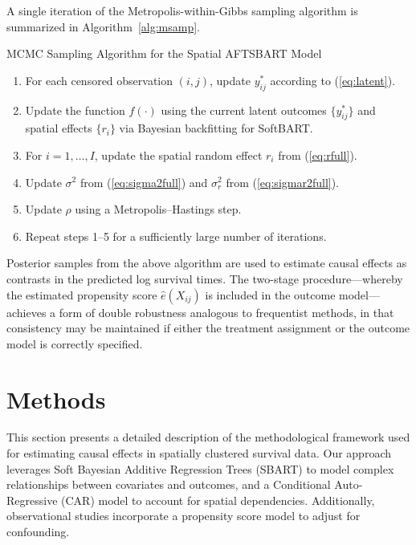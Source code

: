 \documentclass[useAMS,referee]{biom}
\begin{document}
A single iteration of the Metropolis-within-Gibbs sampling algorithm is summarized in Algorithm~\ref{alg:msamp}.

\begin{algorithm}[H]
\caption{MCMC Sampling Algorithm for the Spatial AFTSBART Model}\label{alg:msamp}
\begin{enumerate}
    \item For each censored observation $(i,j)$, update $y_{ij}^\ast$ according to (\ref{eq:latent}).
    \item Update the function $f(\cdot)$ using the current latent outcomes $\{y_{ij}^\ast\}$ and spatial effects $\{r_i\}$ via Bayesian backfitting for SoftBART.
    \item For $i=1,\ldots,I$, update the spatial random effect $r_i$ from (\ref{eq:rfull}).
    \item Update $\sigma^2$ from (\ref{eq:sigma2full}) and $\sigma_r^2$ from (\ref{eq:sigmar2full}).
    \item Update $\rho$ using a Metropolis--Hastings step.
    \item Repeat steps 1--5 for a sufficiently large number of iterations.
\end{enumerate}
\end{algorithm}

Posterior samples from the above algorithm are used to estimate causal effects as contrasts in the predicted log survival times. The two-stage procedure—whereby the estimated propensity score $\hat{e}(X_{ij})$ is included in the outcome model—achieves a form of double robustness analogous to frequentist methods, in that consistency may be maintained if either the treatment assignment or the outcome model is correctly specified.






\section{Methods}

This section presents a detailed description of the methodological framework used for estimating causal effects in spatially clustered survival data. Our approach leverages Soft Bayesian Additive Regression Trees (SBART) to model complex relationships between covariates and outcomes, and a Conditional Auto-Regressive (CAR) model to account for spatial dependencies. Additionally, observational studies incorporate a propensity score model to adjust for confounding. 
\end{document}
